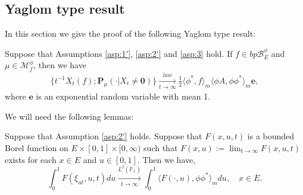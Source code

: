 \subsection{Yaglom type result}
	In this section we give the proof of the following Yaglom type result:
\begin{thm}\label{thm:Yaglom-type-theorem}
	Suppose that Assumptions  \ref{asp:1'}, \ref{asp:2'} and \ref{asp:3} hold.
	If $f\in bp\mathscr B^\phi_E$ and $\mu\in\mathcal M^\phi_f$, then we have
\[\begin{split}
	\big\{t^{-1}X_t(f);\mathbf P_\mu(\cdot | X_t\neq \mathbf 0)\big\}
	\xrightarrow[t\to\infty]{law} \frac{1}{2}\langle \phi^*, f\rangle_m\langle \phi A, \phi\phi^*\rangle_m \mathbf e,
\end{split}\]
	where $\mathbf e$ is an exponential random variable with mean 1.
\end{thm}
	We will need the following lemmas:
\begin{lem}
\label{lem:ergodic}
	Suppose that Assumption \ref{asp:2'} holds. Suppose that $F(x,u,t)$ is a bounded Borel function on $E\times [0,1]\times [0,\infty)$ such that $F(x,u):= \lim_{t\to\infty} F(x,u,t)$ exists for each $x\in E$ and $u\in [0,1]$.
	Then we have,
\[
	\int_0^1 F(\xi_{ut},u,t)du
	\xrightarrow[t\to\infty]{L^2(\dot{\mathbb P}_x)} \int_0^1 \langle F(\cdot ,u),\phi\phi^* \rangle_m du,
	\quad x\in E.
\]
\end{lem}
